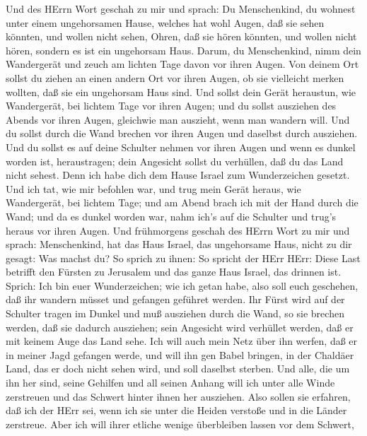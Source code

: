  Und des HErrn Wort geschah zu mir und sprach: 
Du Menschenkind, du wohnest unter einem ungehorsamen Hause, welches hat
wohl Augen, daß sie sehen könnten, und wollen nicht sehen, Ohren, daß
sie hören könnten, und wollen nicht hören, sondern es ist ein ungehorsam
Haus.  Darum, du Menschenkind, nimm dein Wandergerät und
zeuch am lichten Tage davon vor ihren Augen. Von deinem Ort sollst du
ziehen an einen andern Ort vor ihren Augen, ob sie vielleicht merken
wollten, daß sie ein ungehorsam Haus sind.  Und sollst dein
Gerät heraustun, wie Wandergerät, bei lichtem Tage vor ihren Augen; und
du sollst ausziehen des Abends vor ihren Augen, gleichwie man auszieht,
wenn man wandern will.  Und du sollst durch die Wand brechen
vor ihren Augen und daselbst durch ausziehen.  Und du sollst
es auf deine Schulter nehmen vor ihren Augen und wenn es dunkel worden
ist, heraustragen; dein Angesicht sollst du verhüllen, daß du das Land
nicht sehest. Denn ich habe dich dem Hause Israel zum Wunderzeichen
gesetzt.  Und ich tat, wie mir befohlen war, und trug mein
Gerät heraus, wie Wandergerät, bei lichtem Tage; und am Abend brach ich
mit der Hand durch die Wand; und da es dunkel worden war, nahm ich's auf
die Schulter und trug's heraus vor ihren Augen.  Und
frühmorgens geschah des HErrn Wort zu mir und sprach: 
Menschenkind, hat das Haus Israel, das ungehorsame Haus, nicht zu dir
gesagt: Was machst du?  So sprich zu ihnen: So spricht der
HErr HErr: Diese Last betrifft den Fürsten zu Jerusalem und das ganze
Haus Israel, das drinnen ist.  Sprich: Ich bin euer
Wunderzeichen; wie ich getan habe, also soll euch geschehen, daß ihr
wandern müsset und gefangen geführet werden.  Ihr Fürst
wird auf der Schulter tragen im Dunkel und muß ausziehen durch die Wand,
so sie brechen werden, daß sie dadurch ausziehen; sein Angesicht wird
verhüllet werden, daß er mit keinem Auge das Land sehe. 
Ich will auch mein Netz über ihn werfen, daß er in meiner Jagd gefangen
werde, und will ihn gen Babel bringen, in der Chaldäer Land, das er doch
nicht sehen wird, und soll daselbst sterben.  Und alle, die
um ihn her sind, seine Gehilfen und all seinen Anhang will ich unter
alle Winde zerstreuen und das Schwert hinter ihnen her ausziehen.
 Also sollen sie erfahren, daß ich der HErr sei, wenn ich
sie unter die Heiden verstoße und in die Länder zerstreue. 
Aber ich will ihrer etliche wenige überbleiben lassen vor dem Schwert,
